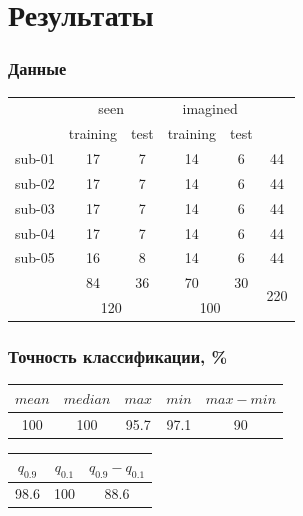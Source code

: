\documentclass{beamer}
\begin{document}
	\section{Результаты}
	\begin{frame} 
		\frametitle{Данные}
		
		\begin{table}[]
			\begin{tabular}{c|cc|cc|c}
				& \multicolumn{2}{c|}{seen}            & \multicolumn{2}{c|}{imagined}        &                      \\ \cline{2-5}
				& \multicolumn{1}{c|}{training} & test & \multicolumn{1}{c|}{training} & test &                      \\ \hline
				sub-01 & \multicolumn{1}{c|}{17}       & 7    & \multicolumn{1}{c|}{14}       & 6    & 44                   \\
				sub-02 & \multicolumn{1}{c|}{17}       & 7    & \multicolumn{1}{c|}{14}       & 6    & 44                   \\
				sub-03 & \multicolumn{1}{c|}{17}       & 7    & \multicolumn{1}{c|}{14}       & 6    & 44                   \\
				sub-04 & \multicolumn{1}{c|}{17}       & 7    & \multicolumn{1}{c|}{14}       & 6    & 44                   \\
				sub-05 & \multicolumn{1}{c|}{16}       & 8    & \multicolumn{1}{c|}{14}       & 6    & 44                   \\ \hline
				& \multicolumn{1}{c|}{84}       & 36   & \multicolumn{1}{c|}{70}       & 30   & \multirow{2}{*}{220} \\ \cline{2-5}
				& \multicolumn{2}{c|}{120}             & \multicolumn{2}{c|}{100}             &                     
			\end{tabular}
		\end{table}
	\end{frame}


	\begin{frame} 
		\frametitle{Точность классификации, \%}
		\vspace{1cm}
		
		\begin{table}
			\begin{tabular}{ccccc}
				$mean$ & $median$ & $max$ & $min$ & $max - min$ \\ \hline
				100 & 100 & 95.7 & 97.1 & 90
			\end{tabular}
		\end{table}
	
		\begin{table}
			\begin{tabular}{ccc}
				$q_{0.9}$ & $q_{0.1}$ & $q_{0.9} - q_{0.1}$ \\ \hline
				98.6 & 100 & 88.6
			\end{tabular}
		\end{table}				
	\end{frame}
		
		
\end{document}

